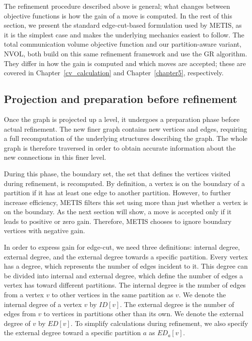 The refinement procedure described above is general; what changes between objective functions is how the gain of a move is computed. In the rest of this section, we present the standard edge-cut-based formulation used by METIS, as it is the simplest case and makes the underlying mechanics easiest to follow. The total communication volume objective function and our partition-aware variant, NVOL, both build on this same refinement framework and use the GR algorithm. They differ in how the gain is computed and which moves are accepted; these are covered in Chapter~\ref{cv_calculation} and Chapter~\ref{chapter5}, respectively.

\subsection{Projection and preparation before refinement}\label{sec:preparation for refinement}
Once the graph is projected up a level, it undergoes a preparation phase before actual refinement. The new finer graph contains new vertices and edges, requiring a full recomputation of the underlying structures describing the graph. The whole graph is therefore traversed in order to obtain accurate information about the new connections in this finer level.

During this phase, the boundary set, the set that defines the vertices visited during refinement, is recomputed. By definition, a vertex is on the boundary of a partition if it has at least one edge to another partition. However, to further increase efficiency, METIS filters this set using more than just whether a vertex is on the boundary. As the next section will show, a move is accepted only if it leads to positive or zero gain. Therefore, METIS chooses to ignore boundary vertices with negative gain.

In order to express gain for edge-cut, we need three definitions: internal degree, external degree, and the external degree towards a specific partition. Every vertex has a degree, which represents the number of edges incident to it. This degree can be divided into internal and external degree, which define the number of edges a vertex has toward different partitions. The internal degree is the number of edges from a vertex $v$ to other vertices in the same partition as $v$. We denote the internal degree of a vertex $v$ by $ID[v]$. The external degree is the number of edges from $v$ to vertices in partitions other than its own. We denote the external degree of $v$ by $ED[v]$. To simplify calculations during refinement, we also specify the external degree toward a specific partition $a$ as $ED_a[v]$.

